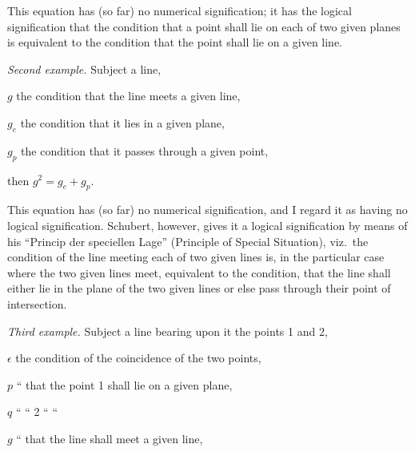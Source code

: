 \documentclass[11pt,a4paper,english]{article}
\theoremstyle{plain}
\begin{document}
This equation has (so far) no numerical signification; it has the logical signification that the condition that a point shall lie on each of two given planes is equivalent to the condition that the point shall lie on a given line.

\textit{Second example.} Subject a line,

\hspace*{2em} $g$ the condition that the line meets a given line,

\hspace*{2em} $g_e$ the condition that it lies in a given plane,

\hspace*{2em} $g_p$ the condition that it passes through a given point,

\hspace*{2em} then $g^2 = g_e + g_p$.

This equation has (so far) no numerical signification, and I regard it as having no logical signification. Schubert, however, gives it a logical signification by means of his ``Princip der speciellen Lage'' (Principle of Special Situation), viz.\ the condition of the line meeting each of two given lines is, in the particular case where the two given lines meet, equivalent to the condition, that the line shall either lie in the plane of the two given lines or else pass through their point of intersection.

\newpage
\textit{Third example.} Subject a line bearing upon it the points 1 and 2,

\hspace*{2em} $\epsilon$ the condition of the coincidence of the two points,

\hspace*{2em} $p$ \hspace{1.5em} `` \hspace{1.5em} that the point 1 shall lie on a given plane,

\hspace*{2em} $q$ \hspace{1.5em} `` \hspace{1.5em} \hspace{1.5em} `` \hspace{1.5em} 2 \hspace{1.5em} `` \hspace{1.5em} ``

\hspace*{2em} $g$ \hspace{1.5em} `` \hspace{1.5em} that the line shall meet a given line,
\end{document}
